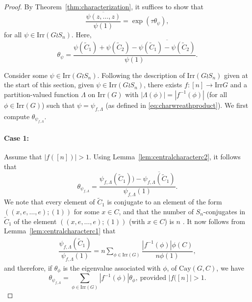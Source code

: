 \documentclass{amsart}
\theoremstyle{plain}
\theoremstyle{remark}\newtheorem{con}[theorem]{Construction}
\theoremstyle{remark} \newtheorem*{remark}{Remark}
\theoremstyle{remark} \newtheorem{example}{Example}
\newcommand{\mrm}{\mathrm}
\newcommand{\ov}{\overline}
\newcommand{\irr}{\mathrm{Irr}}
\begin{document}
\begin{proof}
By Theorem~\ref{thm:characterization}, it suffices to show that 
\[\dfrac{\ov{\psi(z,\ldots, z ) }}{\psi(1)} = \exp\left(\tau \theta_{\psi}\right),\] for all $\psi \in \irr(G \wr S_{n})$. Here,
 \begin{equation}\label{eq:tpsiwr}
\theta_{\psi} = \dfrac{\psi(\tilde{C}_{1})+\psi(\tilde{C}_{2})-\ov{\psi(\tilde{C}_{1})-\psi(\tilde{C}_{2})}}{\psi(1)}.
\end{equation}

Consider some $\psi \in \irr(G \wr S_{n})$.
Following the description of $\irr(G \wr S_{n})$ given at the start of this section, given $\psi \in \irr(G\wr S_{n})$, there exists $f:[n] \to \irr{G}$ and a partition-valued function $\Lambda$ on $\irr(G)$ with $|\Lambda(\phi)|=|f^{-1}(\phi)|$ (for all $\phi \in \irr(G)$) such that $\psi=\psi_{f,\Lambda}$ (as defined in \eqref{eq:charwreathproduct}). We first compute $\theta_{\psi_{f,\Lambda}}$.

\paragraph{Case 1:} Assume that $|f([n])|>1$. Using Lemma~\ref{lem:centralcharacterc2}, it follows that
\[\theta_{\psi_{f, \Lambda}} = \dfrac{\psi_{f, \Lambda}(\tilde{C}_{1}))-\ov{\psi_{f, \Lambda}(\tilde{C}_{1})}}{\psi_{f, \Lambda}(1)}.\] We note that every element of $\tilde{C}_{1}$ is conjugate to an element of the form $((x,e,\ldots ,e) ; (1))$ for some $x\in C$, and that the number of $S_{n}$-conjugates in $\tilde{C}_{1}$ of the element $((x,e,\ldots ,e) ; (1))$ (with $x \in C$) is $n$ . It now follows from Lemma~\ref{lem:centralcharacterc1} that 
\begin{align*}
\dfrac{\psi_{f, \Lambda}(\tilde{C}_{1})}{\psi_{f, \Lambda}(1)} = n\sum\limits_{\phi \in \irr(G)}  \dfrac{|f^{-1}(\phi)|\phi(C)}{n\phi(1)},
\end{align*}
and therefore, if $\theta_{\phi}$ is the eigenvalue associated with $\phi$, of $\mrm{Cay}(G,C)$, we have
\begin{equation}\label{eq:c1sum}
\theta_{\psi_{f, \Lambda}} = \sum\limits_{\phi \in \irr(G)} |f^{-1}(\phi)| \theta_{\phi},\ \text{provided $|f([n]|>1$.}
\end{equation}


\end{proof}
\end{document}
